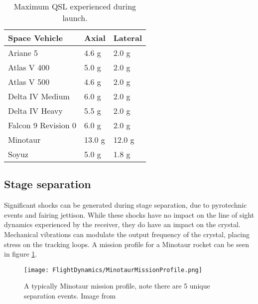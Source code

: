 \begin{table}[!htb]
\centering
\begin{tabular}{|l|l|l|}
\hline
\rowcolor[HTML]{C0C0C0} 
Space Vehicle       & Axial                   & Lateral                \\ \hline
Ariane 5            & 4.6 g \cite{Ariane}     & 2.0 g \cite{Ariane}    \\ \hline
\rowcolor[HTML]{EFEFEF} 
Atlas V 400         & 5.0 g \cite{AtlasV}     & 2.0 g \cite{AtlasV}    \\ \hline
Atlas V 500         & 4.6 g \cite{AtlasV}     & 2.0 g \cite{AtlasV}    \\ \hline
\rowcolor[HTML]{EFEFEF} 
Delta IV Medium     & 6.0 g \cite{DeltaIV}    & 2.0 g \cite{DeltaIV}   \\ \hline
Delta IV Heavy      & 5.5 g \cite{DeltaIV}    & 2.0 g \cite{DeltaIV}   \\ \hline
\rowcolor[HTML]{EFEFEF} 
Falcon 9 Revision 0 & 6.0 g \cite{Falcon9}    & 2.0 g \cite{Falcon9}   \\ \hline
Minotaur            & 13.0 g  \cite{Minotaur} & 12.0 g \cite{Minotaur} \\ \hline
\rowcolor[HTML]{EFEFEF} 
Soyuz               & 5.0 g \cite{Soyuz}      & 1.8 g \cite{Soyuz}     \\ \hline
\end{tabular}
\caption{Maximum \ac{QSL} experienced during launch.}
\label{QSLTable}
\end{table}



\subsection{Stage separation}

Significant shocks can be generated during stage separation, due to pyrotechnic events and fairing jettison\cite{AtlasV,Ariane,DeltaIV}. While these shocks have no impact on the line of sight dynamics experienced by the receiver, they do have an impact on the crystal. Mechanical vibrations can modulate the output frequency of the crystal, placing stress on the tracking loops. A mission profile for a Minotaur rocket can be seen in figure \ref{fig:MinotaurMissionProfile}.


\begin{figure}[!htb] 
    \centering
    \texttt{[image: FlightDynamics/MinotaurMissionProfile.png]} 
    \caption{A typically Minotaur mission profile, note there are 5 unique separation events. Image from \cite{Minotaur}}
    \label{fig:MinotaurMissionProfile}
\end{figure}

